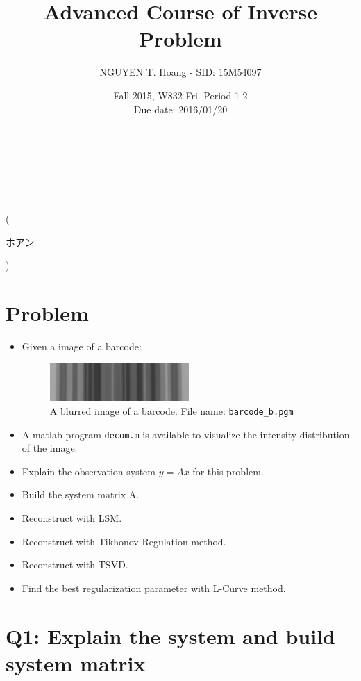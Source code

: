 \documentclass[a4paper,12pt]{article}
\makeatletter
\newcommand{\linia}{\rule{\linewidth}{0.5pt}}
\renewcommand{\maketitle} {
\begin{center}
\vspace{2ex}
{\LARGE \textsc{\@title}}
\vspace{1ex}
\\
\linia\\
\@author \hfill \@date
\vspace{4ex}
\end{center}
}
\makeatother
\begin{document}
\title{Advanced Course of Inverse Problem}

\author{NGUYEN T. Hoang - SID: 15M54097}

\date{Fall 2015, W832 Fri. Period 1-2 \\ \hfill Due date: 2016/01/20}

\maketitle
\vspace{-4.5em}
\hspace{5.3em} (\begin{CJK}{UTF8}{min}ホアン\end{CJK})
\vspace{4em}
\section*{Problem}
\begin{itemize}
	\item Given a image of a barcode:
	\begin{figure}[h]
		\centering
		\includegraphics[width=0.5\textwidth]{barcode_b.jpg}
		\caption{A blurred image of a barcode. File name: \texttt{barcode\_b.pgm}}
		\label{fig:blurbar}
	\end{figure}
    \item A matlab program \texttt{decom.m} is available to visualize the intensity distribution of the image.
	\item Explain the observation system $y=Ax$ for this problem.
	\item Build the system matrix A.
	\item Reconstruct with LSM.
	\item Reconstruct with Tikhonov Regulation method.
	\item Reconstruct with TSVD.
	\item Find the best regularization parameter with L-Curve method. 
\end{itemize}
\vspace{4em}
\pagebreak
\section*{Q1: Explain the system and build system matrix}
\setcounter{section}{1}
\end{document}
